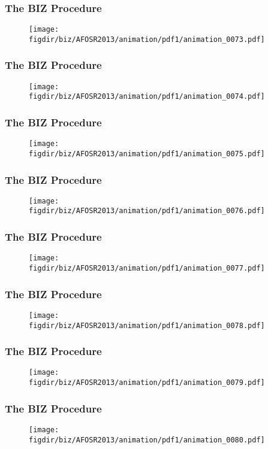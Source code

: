 \documentclass[13pt]{beamer}
\newcommand{\figdir}{../../fig}
\begin{document}
{\begin{frame}\frametitle{The BIZ Procedure}\begin{figure}\texttt{[image: \\figdir/biz/AFOSR2013/animation/pdf1/animation\_0073.pdf]}\end{figure}\end{frame}
\begin{frame}\frametitle{The BIZ Procedure}\begin{figure}\texttt{[image: \\figdir/biz/AFOSR2013/animation/pdf1/animation\_0074.pdf]}\end{figure}\end{frame}
\begin{frame}\frametitle{The BIZ Procedure}\begin{figure}\texttt{[image: \\figdir/biz/AFOSR2013/animation/pdf1/animation\_0075.pdf]}\end{figure}\end{frame}
\begin{frame}\frametitle{The BIZ Procedure}\begin{figure}\texttt{[image: \\figdir/biz/AFOSR2013/animation/pdf1/animation\_0076.pdf]}\end{figure}\end{frame}
\begin{frame}\frametitle{The BIZ Procedure}\begin{figure}\texttt{[image: \\figdir/biz/AFOSR2013/animation/pdf1/animation\_0077.pdf]}\end{figure}\end{frame}
\begin{frame}\frametitle{The BIZ Procedure}\begin{figure}\texttt{[image: \\figdir/biz/AFOSR2013/animation/pdf1/animation\_0078.pdf]}\end{figure}\end{frame}
\begin{frame}\frametitle{The BIZ Procedure}\begin{figure}\texttt{[image: \\figdir/biz/AFOSR2013/animation/pdf1/animation\_0079.pdf]}\end{figure}\end{frame}
\begin{frame}\frametitle{The BIZ Procedure}\begin{figure}\texttt{[image: \\figdir/biz/AFOSR2013/animation/pdf1/animation\_0080.pdf]}\end{figure}\end{frame}
}
\end{document}
